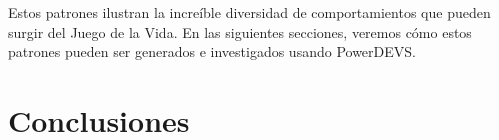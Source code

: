 \documentclass[]{article}
\begin{document}

Estos patrones ilustran la increíble diversidad de comportamientos que pueden surgir del Juego de la Vida. En las siguientes secciones, veremos cómo estos patrones pueden ser generados e investigados usando PowerDEVS.



\section{Conclusiones}
\end{document}
